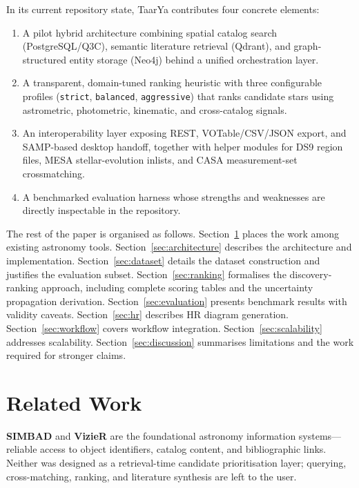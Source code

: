 \documentclass[12pt]{elsarticle}
\begin{document}
In its current repository state, \textsf{TaarYa} contributes four concrete elements:

\begin{enumerate}
    \item A pilot hybrid architecture combining spatial catalog search (PostgreSQL/Q3C), semantic literature retrieval (Qdrant), and graph-structured entity storage (Neo4j) behind a unified orchestration layer.
    \item A transparent, domain-tuned ranking heuristic with three configurable profiles (\texttt{strict}, \texttt{balanced}, \texttt{aggressive}) that ranks candidate stars using astrometric, photometric, kinematic, and cross-catalog signals.
    \item An interoperability layer exposing REST, VOTable/CSV/JSON export, and SAMP-based desktop handoff, together with helper modules for DS9 region files, MESA stellar-evolution inlists, and CASA measurement-set cross\-matching.
    \item A benchmarked evaluation harness whose strengths and weaknesses are directly inspectable in the repository.
\end{enumerate}

The rest of the paper is organised as follows. Section~\ref{sec:related} places the work among existing astronomy tools. Section~\ref{sec:architecture} describes the architecture and implementation. Section~\ref{sec:dataset} details the dataset construction and justifies the evaluation subset. Section~\ref{sec:ranking} formalises the discovery-ranking approach, including complete scoring tables and the uncertainty propagation derivation. Section~\ref{sec:evaluation} presents benchmark results with validity caveats. Section~\ref{sec:hr} describes HR diagram generation. Section~\ref{sec:workflow} covers workflow integration. Section~\ref{sec:scalability} addresses scalability. Section~\ref{sec:discussion} summarises limitations and the work required for stronger claims.

\section{Related Work}
\label{sec:related}

\textbf{SIMBAD} \citep{Wenger2000} and \textbf{VizieR} \citep{Ochsenbein2000} are the foundational astronomy information systems---reliable access to object identifiers, catalog content, and bibliographic links. Neither was designed as a retrieval-time candidate prioritisation layer; querying, cross-matching, ranking, and literature synthesis are left to the user.
\end{document}
